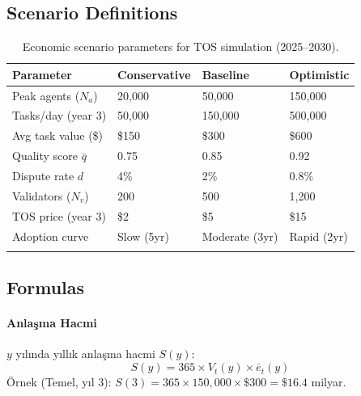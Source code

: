 \documentclass[11pt]{article}
\begin{document}
\begin{itemize}[noitemsep]
\begin{itemize}[noitemsep]
\begin{itemize}[noitemsep]
\begin{itemize}[noitemsep]
\begin{itemize}[noitemsep]
\begin{itemize}[noitemsep]
\begin{itemize}[noitemsep]
\begin{enumerate}[noitemsep]
\begin{itemize}[noitemsep]
\subsection{Scenario Definitions}
\begin{longtable}{@{}p{}p{}p{}p{}@{}}
\toprule
\textbf{Parameter} & \textbf{Conservative} & \textbf{Baseline} & \textbf{Optimistic} \\\midrule
Peak agents ($N_a$) & 20,000 & 50,000 & 150,000 \\
Tasks/day (year 3) & 50,000 & 150,000 & 500,000 \\
Avg task value (\$) & \$150 & \$300 & \$600 \\
Quality score $\bar{q}$ & 0.75 & 0.85 & 0.92 \\
Dispute rate $d$ & 4\% & 2\% & 0.8\% \\
Validators ($N_v$) & 200 & 500 & 1,200 \\
TOS price (year 3) & \$2 & \$5 & \$15 \\
Adoption curve & Slow (5yr) & Moderate (3yr) & Rapid (2yr) \\\bottomrule
\caption{Economic scenario parameters for TOS simulation (2025--2030).}
\label{tab:econ-scenarios}
\end{longtable}

\subsection{Formulas}
\paragraph{Anlaşma Hacmi} $y$ yılında yıllık anlaşma hacmi $S(y)$:
\begin{equation}
S(y) = 365 \times V_t(y) \times \bar{e}_t(y)
\end{equation}
Örnek (Temel, yıl 3): $S(3) = 365 \times 150{,}000 \times \$300 = \$16.4$ milyar.


\end{itemize}
\end{enumerate}
\end{itemize}
\end{itemize}
\end{itemize}
\end{itemize}
\end{itemize}
\end{itemize}
\end{itemize}
\end{document}
